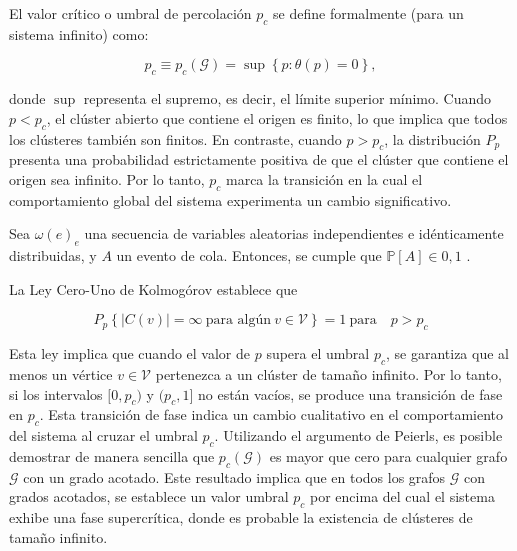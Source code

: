 El valor crítico o umbral de percolación $p_c$ se define formalmente (para un sistema infinito) como:

\begin{equation}\label{eq:3}
p_c \equiv p_c( \mathcal{G}) = \sup\left\{p:\theta(p)=0\right\},
\end{equation}


donde $\sup$ representa el supremo, es decir, el límite superior mínimo. Cuando $p < p_c$, el clúster abierto que contiene el origen es finito, lo que implica que todos los clústeres también son finitos. En contraste, cuando $p > p_c$, la distribución $P_p$ presenta una probabilidad estrictamente positiva de que el clúster que contiene el origen sea infinito. Por lo tanto, $p_c$ marca la transición en la cual el comportamiento global del sistema experimenta un cambio significativo.



\begin{theorem}[Ley Cero-Uno de Kolmogórov] %
	Sea $\omega(e)_e$  una secuencia de variables aleatorias independientes e idénticamente distribuidas, y $A$ un evento de cola. Entonces, se cumple que $\mathbb{P}[A] \in {0, 1}$ .
\end{theorem}

La Ley Cero-Uno de Kolmogórov establece que 

\begin{equation}\label{eq:4}
P_p\left\{\left| C(v)\right| =\infty \ \text{para algún} \ v \in  \mathcal{V}  \right\} = 1 \ \text{para} \quad p>p_c
\end{equation}

Esta ley implica que cuando el valor de $p$ supera el umbral $p_c$, se garantiza que al menos un vértice $v \in \mathcal{V}$ pertenezca a un clúster de tamaño infinito.
Por lo tanto, si los intervalos $[0, p_c)$ y $(p_c, 1]$ no están vacíos, se produce una transición de fase en $p_c$. Esta transición de fase indica un cambio cualitativo en el comportamiento del sistema al cruzar el umbral $p_c$.  Utilizando el argumento de Peierls, es posible demostrar de manera sencilla que $p_c(\mathcal{G} )$ es mayor que cero para cualquier grafo $\mathcal{G}$ con un grado acotado. Este resultado implica que en todos los grafos $\mathcal{G}$  con grados acotados, se establece un valor umbral $p_c$ por encima del cual el sistema exhibe una fase supercrítica, donde es probable la existencia de clústeres de tamaño infinito.


